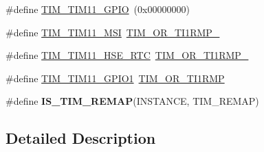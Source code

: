 \begin{DoxyCompactItemize}
\item 
\#define \hyperlink{group___t_i_m_ex___remap_gac8a0bac87924350651da1957081bc9ae}{T\-I\-M\-\_\-\-T\-I\-M11\-\_\-\-G\-P\-I\-O}~(0x00000000)
\item 
\#define \hyperlink{group___t_i_m_ex___remap_gaf035db5c13b0c2b3b82955af16185fe7}{T\-I\-M\-\_\-\-T\-I\-M11\-\_\-\-M\-S\-I}~\hyperlink{group___peripheral___registers___bits___definition_ga2f9ba136b3dca26c39de5da6eca8fbc1}{T\-I\-M\-\_\-\-O\-R\-\_\-\-T\-I1\-R\-M\-P\-\_}
\item 
\#define \hyperlink{group___t_i_m_ex___remap_ga60bc41ce7cbd8c5cee126115c2f2f1a4}{T\-I\-M\-\_\-\-T\-I\-M11\-\_\-\-H\-S\-E\-\_\-\-R\-T\-C}~\hyperlink{group___peripheral___registers___bits___definition_gaf91cb3077c1904d1e039c99725297bdb}{T\-I\-M\-\_\-\-O\-R\-\_\-\-T\-I1\-R\-M\-P\-\_}
\item 
\#define \hyperlink{group___t_i_m_ex___remap_gab089a04492fc362a2c51154b3400df8e}{T\-I\-M\-\_\-\-T\-I\-M11\-\_\-\-G\-P\-I\-O1}~\hyperlink{group___peripheral___registers___bits___definition_gab06e0dfcaeb7a7be254b71b1d4c3fd44}{T\-I\-M\-\_\-\-O\-R\-\_\-\-T\-I1\-R\-M\-P}
\item 
\#define {\bfseries I\-S\-\_\-\-T\-I\-M\-\_\-\-R\-E\-M\-A\-P}(I\-N\-S\-T\-A\-N\-C\-E, T\-I\-M\-\_\-\-R\-E\-M\-A\-P)
\end{DoxyCompactItemize}


\subsection{Detailed Description}



